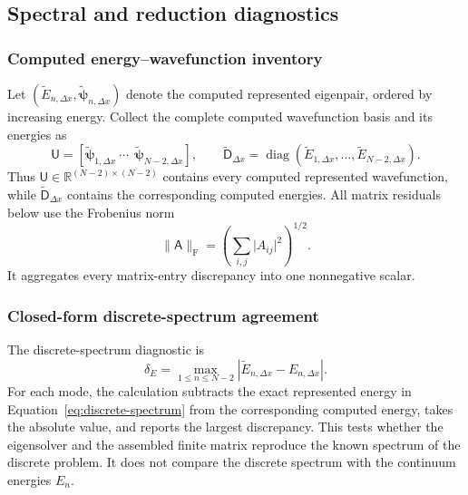 \documentclass[11pt]{article}
\newcommand{\fro}{\mathrm{F}}
\newcommand{\RR}{\mathbb{R}}
\newcommand{\mat}[1]{\mathsf{#1}}
\newcommand{\vect}[1]{\boldsymbol{#1}}
\begin{document}
\subsection{Spectral and reduction diagnostics}

\subsubsection{Computed energy--wavefunction inventory}

Let $(\widetilde E_{n,\Delta x},
\widetilde{\vect{\psi}}_{n,\Delta x})$ denote the computed represented eigenpair,
ordered by increasing energy. Collect the complete computed wavefunction basis and
its energies as
\begin{equation}
 \mat{U}=[\widetilde{\vect{\psi}}_{1,\Delta x}\ \cdots\
 \ \widetilde{\vect{\psi}}_{N-2,\Delta x}],
 \qquad
 \widetilde{\mat{D}}_{\Delta x}
 =\operatorname{diag}(\widetilde E_{1,\Delta x},\ldots,
 \widetilde E_{N-2,\Delta x}).
 \label{eq:computed-eigenpair-inventory}
\end{equation}
Thus $\mat{U}\in\RR^{(N-2)\times(N-2)}$ contains every computed represented
wavefunction, while $\widetilde{\mat{D}}_{\Delta x}$ contains the corresponding
computed energies.
All matrix residuals below use the Frobenius norm
\begin{equation}
 \lVert\mat{A}\rVert_{\fro}
 =\left(\sum_{i,j}\lvert A_{ij}\rvert^2\right)^{1/2}.
 \label{eq:frobenius-norm}
\end{equation}
It aggregates every matrix-entry discrepancy into one nonnegative scalar.

\subsubsection{Closed-form discrete-spectrum agreement}

The discrete-spectrum diagnostic is
\begin{equation}
 \delta_E
 =\max_{1\leq n\leq N-2}
 \left\lvert\widetilde E_{n,\Delta x}
 -E_{n,\Delta x}\right\rvert.
 \label{eq:discrete-spectrum-diagnostic}
\end{equation}
For each mode, the calculation subtracts the exact represented energy in
Equation~\eqref{eq:discrete-spectrum} from the corresponding computed energy, takes
the absolute value, and reports the largest discrepancy. This tests whether the
eigensolver and the assembled finite matrix reproduce the known spectrum of the
discrete problem. It does not compare the discrete spectrum with the continuum
energies $E_n$.
\end{document}
